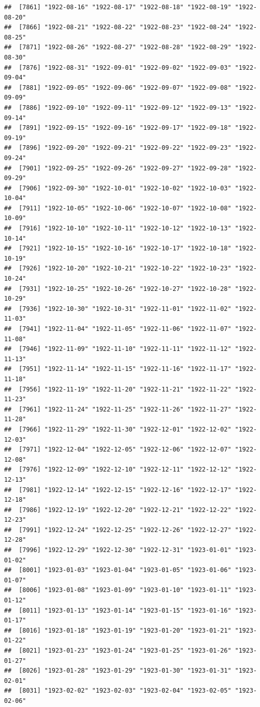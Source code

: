 \documentclass{article}\usepackage[]{graphicx}\usepackage[]{color}
\makeatletter
\newenvironment{kframe}{%
 \def\at@end@of@kframe{}%
 \ifinner\ifhmode%
  \def\at@end@of@kframe{\end{minipage}}%
  \begin{minipage}{\columnwidth}%
 \fi\fi%
 \def\FrameCommand##1{\hskip\@totalleftmargin \hskip-\fboxsep
 \colorbox{shadecolor}{##1}\hskip-\fboxsep
     \hskip-\linewidth \hskip-\@totalleftmargin \hskip\columnwidth}%
 \MakeFramed {\advance\hsize-\width
   \@totalleftmargin\z@ \linewidth\hsize
   \@setminipage}}%
 {\par\unskip\endMakeFramed%
 \at@end@of@kframe}
\newenvironment{knitrout}{}{} %
\makeatother
\begin{document}
\begin{description}
\begin{knitrout}
\begin{kframe}
\begin{verbatim}
##  [7861] "1922-08-16" "1922-08-17" "1922-08-18" "1922-08-19" "1922-08-20"
##  [7866] "1922-08-21" "1922-08-22" "1922-08-23" "1922-08-24" "1922-08-25"
##  [7871] "1922-08-26" "1922-08-27" "1922-08-28" "1922-08-29" "1922-08-30"
##  [7876] "1922-08-31" "1922-09-01" "1922-09-02" "1922-09-03" "1922-09-04"
##  [7881] "1922-09-05" "1922-09-06" "1922-09-07" "1922-09-08" "1922-09-09"
##  [7886] "1922-09-10" "1922-09-11" "1922-09-12" "1922-09-13" "1922-09-14"
##  [7891] "1922-09-15" "1922-09-16" "1922-09-17" "1922-09-18" "1922-09-19"
##  [7896] "1922-09-20" "1922-09-21" "1922-09-22" "1922-09-23" "1922-09-24"
##  [7901] "1922-09-25" "1922-09-26" "1922-09-27" "1922-09-28" "1922-09-29"
##  [7906] "1922-09-30" "1922-10-01" "1922-10-02" "1922-10-03" "1922-10-04"
##  [7911] "1922-10-05" "1922-10-06" "1922-10-07" "1922-10-08" "1922-10-09"
##  [7916] "1922-10-10" "1922-10-11" "1922-10-12" "1922-10-13" "1922-10-14"
##  [7921] "1922-10-15" "1922-10-16" "1922-10-17" "1922-10-18" "1922-10-19"
##  [7926] "1922-10-20" "1922-10-21" "1922-10-22" "1922-10-23" "1922-10-24"
##  [7931] "1922-10-25" "1922-10-26" "1922-10-27" "1922-10-28" "1922-10-29"
##  [7936] "1922-10-30" "1922-10-31" "1922-11-01" "1922-11-02" "1922-11-03"
##  [7941] "1922-11-04" "1922-11-05" "1922-11-06" "1922-11-07" "1922-11-08"
##  [7946] "1922-11-09" "1922-11-10" "1922-11-11" "1922-11-12" "1922-11-13"
##  [7951] "1922-11-14" "1922-11-15" "1922-11-16" "1922-11-17" "1922-11-18"
##  [7956] "1922-11-19" "1922-11-20" "1922-11-21" "1922-11-22" "1922-11-23"
##  [7961] "1922-11-24" "1922-11-25" "1922-11-26" "1922-11-27" "1922-11-28"
##  [7966] "1922-11-29" "1922-11-30" "1922-12-01" "1922-12-02" "1922-12-03"
##  [7971] "1922-12-04" "1922-12-05" "1922-12-06" "1922-12-07" "1922-12-08"
##  [7976] "1922-12-09" "1922-12-10" "1922-12-11" "1922-12-12" "1922-12-13"
##  [7981] "1922-12-14" "1922-12-15" "1922-12-16" "1922-12-17" "1922-12-18"
##  [7986] "1922-12-19" "1922-12-20" "1922-12-21" "1922-12-22" "1922-12-23"
##  [7991] "1922-12-24" "1922-12-25" "1922-12-26" "1922-12-27" "1922-12-28"
##  [7996] "1922-12-29" "1922-12-30" "1922-12-31" "1923-01-01" "1923-01-02"
##  [8001] "1923-01-03" "1923-01-04" "1923-01-05" "1923-01-06" "1923-01-07"
##  [8006] "1923-01-08" "1923-01-09" "1923-01-10" "1923-01-11" "1923-01-12"
##  [8011] "1923-01-13" "1923-01-14" "1923-01-15" "1923-01-16" "1923-01-17"
##  [8016] "1923-01-18" "1923-01-19" "1923-01-20" "1923-01-21" "1923-01-22"
##  [8021] "1923-01-23" "1923-01-24" "1923-01-25" "1923-01-26" "1923-01-27"
##  [8026] "1923-01-28" "1923-01-29" "1923-01-30" "1923-01-31" "1923-02-01"
##  [8031] "1923-02-02" "1923-02-03" "1923-02-04" "1923-02-05" "1923-02-06"

\end{verbatim}
\end{kframe}
\end{knitrout}
\end{description}
\end{document}
